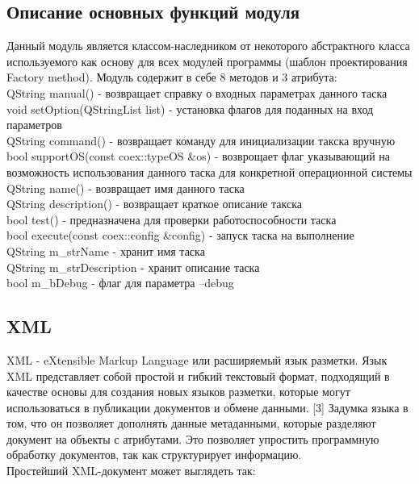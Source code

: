 \subsection{Описание основных функций модуля}

Данный модуль является классом-наследником от некоторого абстрактного класса используемого как основу для всех модулей программы (шаблон проектирования Factory method). Модуль содержит в себе 8 методов и 3 атрибута: \\

QString manual() - возвращает справку о входных параметрах данного таска \\
void setOption(QStringList list) - установка флагов для поданных на вход параметров \\
QString command() - возвращает команду для инициализации такска вручную \\
bool supportOS(const coex::typeOS &os) - возврощает флаг указывающий на возможность использования данного таска для конкретной операционной системы \\
QString name() - возвращает имя данного таска \\
QString description() - возвращает краткое описание такска \\
bool test() - предназначена для проверки работоспособности таска \\
bool execute(const coex::config &config) - запуск таска на выполнение \\
QString m_strName - хранит имя таска \\
QString m_strDescription - хранит описание таска \\
bool m_bDebug - флаг для параметра –debug \\

\subsection{XML}

XML - eXtensible Markup Language или расширяемый язык разметки. Язык XML представляет собой простой и гибкий текстовый формат, подходящий в качестве основы для создания новых языков разметки, которые могут использоваться в публикации документов и обмене данными. [3] Задумка языка в том, что он позволяет дополнять данные метаданными, которые разделяют документ на объекты с атрибутами. Это позволяет упростить программную обработку документов, так как структурирует информацию. \\

Простейший XML-документ может выглядеть так: \\

